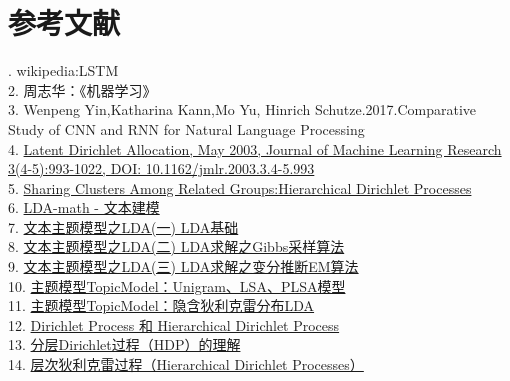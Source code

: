 \documentclass[a4paper]{article}
\begin{document}
   \section{参考文献}
   . wikipedia:LSTM\\
   2. 周志华：《机器学习》\\
   3. Wenpeng Yin,Katharina Kann,Mo Yu, Hinrich Schutze.2017.Comparative Study of CNN and RNN for Natural Language Processing  \\
   4. \href {http://www.jmlr.org/papers/volume3/blei03a/blei03a.pdf}
   {Latent Dirichlet Allocation, May 2003, Journal of Machine Learning Research 3(4-5):993-1022, DOI: 10.1162/jmlr.2003.3.4-5.993}\\
   5. \href {http://papers.nips.cc/paper/2698-sharing-clusters-among-related-groups-hierarchical-dirichlet-processes.pdf}
   {Sharing Clusters Among Related Groups:Hierarchical Dirichlet Processes}\\
   6. \href {https://cosx.org/2013/03/lda-math-text-modeling/}
   {LDA-math - 文本建模}\\
   7. \href {http://www.cnblogs.com/pinard/p/6831308.html}
   {文本主题模型之LDA(一) LDA基础}\\
   8. \href {http://www.cnblogs.com/pinard/p/6867828.html}
   {文本主题模型之LDA(二) LDA求解之Gibbs采样算法}\\
   9. \href {http://www.cnblogs.com/pinard/p/6873703.html}
   {文本主题模型之LDA(三) LDA求解之变分推断EM算法}\\
   10. \href {https://blog.csdn.net/pipisorry/article/details/42560693}
   {主题模型TopicModel：Unigram、LSA、PLSA模型}\\
   11. \href {https://blog.csdn.net/pipisorry/article/details/42649657}
   {主题模型TopicModel：隐含狄利克雷分布LDA}\\
   12. \href {https://www.cnblogs.com/jiang1st2010/archive/2013/05/12/3076331.html}
   {Dirichlet Process 和 Hierarchical Dirichlet Process}\\
   13. \href {https://blog.csdn.net/sysuhu/article/details/54378468}
   {分层Dirichlet过程（HDP）的理解}\\
   14. \href {http://www.datalearner.com/blog/1051487944219663}
   {层次狄利克雷过程（Hierarchical Dirichlet Processes）}\\
   
\end{document}
